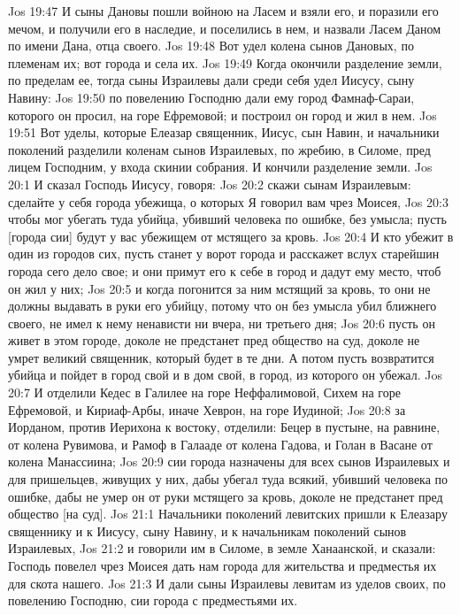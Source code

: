 Jos 19:47  И сыны Дановы пошли войною на Ласем и взяли его, и поразили его мечом, и получили его в наследие, и поселились в нем, и назвали Ласем Даном по имени Дана, отца своего.
Jos 19:48  Вот удел колена сынов Дановых, по племенам их; вот города и села их.
Jos 19:49  Когда окончили разделение земли, по пределам ее, тогда сыны Израилевы дали среди себя удел Иисусу, сыну Навину:
Jos 19:50  по повелению Господню дали ему город Фамнаф-Сараи, которого он просил, на горе Ефремовой; и построил он город и жил в нем.
Jos 19:51  Вот уделы, которые Елеазар священник, Иисус, сын Навин, и начальники поколений разделили коленам сынов Израилевых, по жребию, в Силоме, пред лицем Господним, у входа скинии собрания. И кончили разделение земли.
Jos 20:1  И сказал Господь Иисусу, говоря:
Jos 20:2  скажи сынам Израилевым: сделайте у себя города убежища, о которых Я говорил вам чрез Моисея,
Jos 20:3  чтобы мог убегать туда убийца, убивший человека по ошибке, без умысла; пусть [города сии] будут у вас убежищем от мстящего за кровь.
Jos 20:4  И кто убежит в один из городов сих, пусть станет у ворот города и расскажет вслух старейшин города сего дело свое; и они примут его к себе в город и дадут ему место, чтоб он жил у них;
Jos 20:5  и когда погонится за ним мстящий за кровь, то они не должны выдавать в руки его убийцу, потому что он без умысла убил ближнего своего, не имел к нему ненависти ни вчера, ни третьего дня;
Jos 20:6  пусть он живет в этом городе, доколе не предстанет пред общество на суд, доколе не умрет великий священник, который будет в те дни. А потом пусть возвратится убийца и пойдет в город свой и в дом свой, в город, из которого он убежал.
Jos 20:7  И отделили Кедес в Галилее на горе Неффалимовой, Сихем на горе Ефремовой, и Кириаф-Арбы, иначе Хеврон, на горе Иудиной;
Jos 20:8  за Иорданом, против Иерихона к востоку, отделили: Бецер в пустыне, на равнине, от колена Рувимова, и Рамоф в Галааде от колена Гадова, и Голан в Васане от колена Манассиина;
Jos 20:9  сии города назначены для всех сынов Израилевых и для пришельцев, живущих у них, дабы убегал туда всякий, убивший человека по ошибке, дабы не умер он от руки мстящего за кровь, доколе не предстанет пред общество [на суд].
Jos 21:1  Начальники поколений левитских пришли к Елеазару священнику и к Иисусу, сыну Навину, и к начальникам поколений сынов Израилевых,
Jos 21:2  и говорили им в Силоме, в земле Ханаанской, и сказали: Господь повелел чрез Моисея дать нам города для жительства и предместья их для скота нашего.
Jos 21:3  И дали сыны Израилевы левитам из уделов своих, по повелению Господню, сии города с предместьями их.
